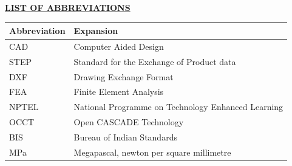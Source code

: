 \documentclass[12pt,a4paper]{report}
\newcommand{\hdr}{}
\newcommand{\fmhead}[1]{\begin{center}{\fontsize{16}{20}\selectfont\bfseries\underline{#1}}\end{center}\vspace{2mm}}
\begin{document}
\fmhead{LIST OF ABBREVIATIONS}
\begin{tabularx}{\textwidth}{@{}l X@{}}
\toprule Abbreviation & Expansion\\\midrule
CAD & Computer Aided Design\\
STEP & Standard for the Exchange of Product data\\
DXF & Drawing Exchange Format\\
FEA & Finite Element Analysis\\
NPTEL & National Programme on Technology Enhanced Learning\\
OCCT & Open CASCADE Technology\\
BIS & Bureau of Indian Standards\\
MPa & Megapascal, newton per square millimetre\\
\bottomrule\end{tabularx}
\normalsize\onehalfspacing

\clearpage
{}\renewcommand{\hdr}{\leftmark}
\newcommand{\inchapter}[1]{\IfFileExists{#1.tex}{}{\chapter{Placeholder #1}}}
\end{document}
